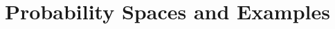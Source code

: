 \documentclass[british,11pt,a4paper]{report}
\begin{document}
\maketitle
\tableofcontents
\chapter{Probability Spaces and Examples}

\end{document}
